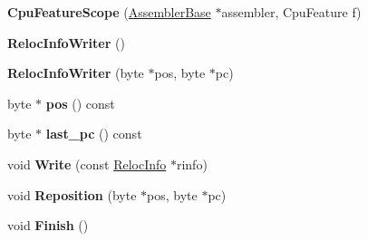 \begin{DoxyCompactItemize}
\item 
{\bfseries Cpu\+Feature\+Scope} (\hyperlink{classv8_1_1internal_1_1_assembler_base}{Assembler\+Base} $\ast$assembler, Cpu\+Feature f)\hypertarget{classv8_1_1internal_1_1_b_a_s_e___e_m_b_e_d_d_e_d_a98a7a2009545f6b7a17d0195b1234a73}{}\label{classv8_1_1internal_1_1_b_a_s_e___e_m_b_e_d_d_e_d_a98a7a2009545f6b7a17d0195b1234a73}

\item 
{\bfseries Reloc\+Info\+Writer} ()\hypertarget{classv8_1_1internal_1_1_b_a_s_e___e_m_b_e_d_d_e_d_aadb1f2240acf4c52cb98fdc3938ecb33}{}\label{classv8_1_1internal_1_1_b_a_s_e___e_m_b_e_d_d_e_d_aadb1f2240acf4c52cb98fdc3938ecb33}

\item 
{\bfseries Reloc\+Info\+Writer} (byte $\ast$pos, byte $\ast$pc)\hypertarget{classv8_1_1internal_1_1_b_a_s_e___e_m_b_e_d_d_e_d_a58bd207ad9829e334caf258c86e8eeb5}{}\label{classv8_1_1internal_1_1_b_a_s_e___e_m_b_e_d_d_e_d_a58bd207ad9829e334caf258c86e8eeb5}

\item 
byte $\ast$ {\bfseries pos} () const \hypertarget{classv8_1_1internal_1_1_b_a_s_e___e_m_b_e_d_d_e_d_a7c91465efecbd5f6f04c433375201173}{}\label{classv8_1_1internal_1_1_b_a_s_e___e_m_b_e_d_d_e_d_a7c91465efecbd5f6f04c433375201173}

\item 
byte $\ast$ {\bfseries last\+\_\+pc} () const \hypertarget{classv8_1_1internal_1_1_b_a_s_e___e_m_b_e_d_d_e_d_abd10aa2108c1dd78f94a479cb4b2148f}{}\label{classv8_1_1internal_1_1_b_a_s_e___e_m_b_e_d_d_e_d_abd10aa2108c1dd78f94a479cb4b2148f}

\item 
void {\bfseries Write} (const \hyperlink{classv8_1_1internal_1_1_reloc_info}{Reloc\+Info} $\ast$rinfo)\hypertarget{classv8_1_1internal_1_1_b_a_s_e___e_m_b_e_d_d_e_d_a0be6c9ab97d0a0fd909926193107dc64}{}\label{classv8_1_1internal_1_1_b_a_s_e___e_m_b_e_d_d_e_d_a0be6c9ab97d0a0fd909926193107dc64}

\item 
void {\bfseries Reposition} (byte $\ast$pos, byte $\ast$pc)\hypertarget{classv8_1_1internal_1_1_b_a_s_e___e_m_b_e_d_d_e_d_ac04e5f289868ff06e062a1f4b32fad1f}{}\label{classv8_1_1internal_1_1_b_a_s_e___e_m_b_e_d_d_e_d_ac04e5f289868ff06e062a1f4b32fad1f}

\item 
void {\bfseries Finish} ()\hypertarget{classv8_1_1internal_1_1_b_a_s_e___e_m_b_e_d_d_e_d_ab548eea67f623b5c744d4cde85093de7}{}\label{classv8_1_1internal_1_1_b_a_s_e___e_m_b_e_d_d_e_d_ab548eea67f623b5c744d4cde85093de7}


\end{DoxyCompactItemize}
